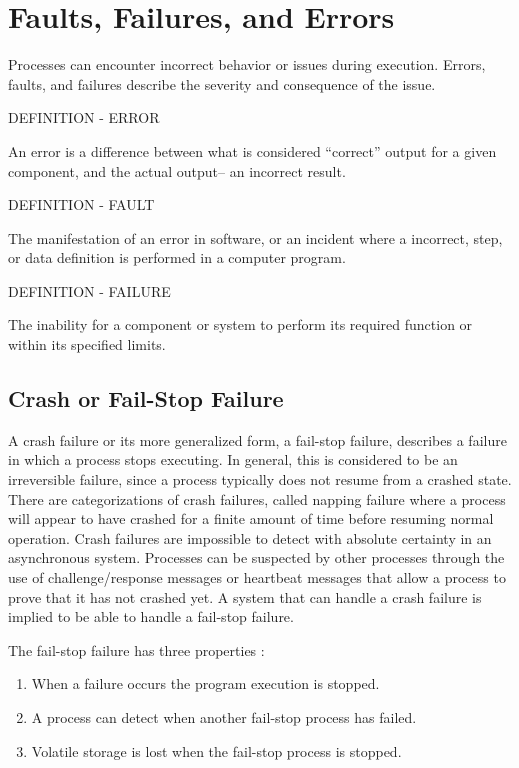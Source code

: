 \section{Faults, Failures, and Errors}

Processes can encounter incorrect behavior or issues during execution.
Errors, faults, and failures describe the severity and consequence of the issue.

DEFINITION - ERROR

An error is a difference between what is considered ``correct'' output for a given component, and the actual output-- an incorrect result.

DEFINITION - FAULT

The manifestation of an error in software, or an incident where a incorrect, step, or data definition is performed in a computer program.

DEFINITION - FAILURE

The inability for a component or system to perform its required function or within its specified limits.

\subsection{Crash or Fail-Stop Failure}

A crash failure or its more generalized form, a fail-stop failure, describes a failure in which a process stops executing.
In general, this is considered to be an irreversible failure, since a process typically does not resume from a crashed state.
There are categorizations of crash failures, called napping failure where a process will appear to have crashed for a finite amount of time before resuming normal operation.
Crash failures are impossible to detect with absolute certainty in an asynchronous system.
Processes can be suspected by other processes through the use of challenge/response messages or heartbeat messages that allow a process to prove that it has not crashed yet.
A system that can handle a crash failure is implied to be able to handle a fail-stop failure.\cite{DISTRIBUTED}

The fail-stop failure has three properties \cite{DISTRIBUTED}:

\begin{enumerate}
\item When a failure occurs the program execution is stopped.
\item A process can detect when another fail-stop process has failed.
\item Volatile storage is lost when the fail-stop process is stopped.
\end{enumerate}

